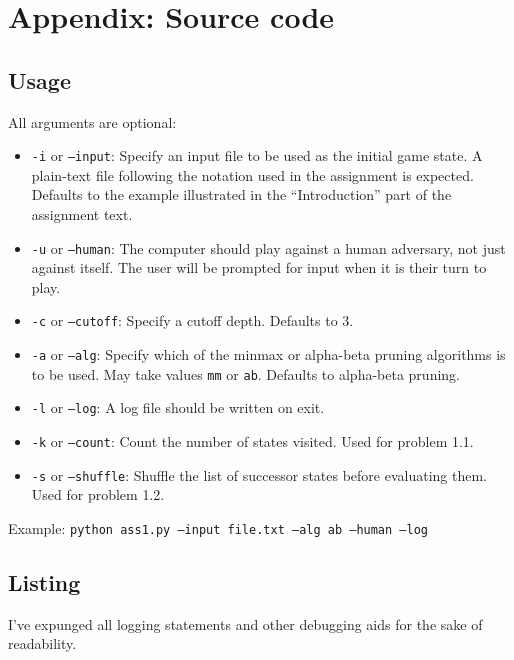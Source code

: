 \documentclass[letterpaper, 12pt]{article}
\numberwithin{theorem}{section}
\begin{document}
\clearpage
\appendix
\section{Appendix: Source code}

\subsection{Usage}
All arguments are optional:
\begin{itemize}
	\item \texttt{-i} or \texttt{--input}: Specify an input file to be used as the initial game state. A plain-text file following the notation used in the assignment is expected. Defaults to the example illustrated in the ``Introduction'' part of the assignment text.
	\item \texttt{-u} or \texttt{--human}: The computer should play against a human adversary, not just against itself. The user will be prompted for input when it is their turn to play.
	\item \texttt{-c} or \texttt{--cutoff}: Specify a cutoff depth. Defaults to 3.
	\item \texttt{-a} or \texttt{--alg}: Specify which of the minmax or alpha-beta pruning algorithms is to be used. May take values \texttt{mm} or \texttt{ab}. Defaults to alpha-beta pruning.
	\item \texttt{-l} or \texttt{--log}: A log file should be written on exit.
	\item \texttt{-k} or \texttt{--count}: Count the number of states visited. Used for problem 1.1.
	\item \texttt{-s} or \texttt{--shuffle}: Shuffle the list of successor states before evaluating them. Used for problem 1.2.
\end{itemize}
Example: \texttt{python ass1.py --input file.txt --alg ab --human --log}

\subsection{Listing}
I've expunged all logging statements and other debugging aids for the sake of readability. 

\end{document}
